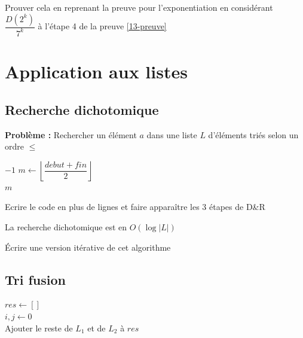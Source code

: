 \begin{exercise}
	Prouver cela en reprenant la preuve pour l'exponentiation en considérant $\dfrac{D(2^k)}{7^k}$ à l'étape 4 de la preuve \ref{13-preuve}
\end{exercise}

\section{Application aux listes}
	
\subsection{Recherche dichotomique}

\label{13-dico}

\textbf{Problème :} Rechercher un élément $a$ dans une liste $L$ d'éléments triés selon un ordre $\leq$

\begin{algorithm}[H]
	\caption{$recherche\_dichotomique(l, a, debut, fin)$}
		{\Retour $-1$}
	$m \gets \left\lfloor \dfrac{debut + fin}{2}\right\rfloor$ \\
		{\Retour $m$}
		{}
		{}
\end{algorithm}

\begin{exercise}
	Ecrire le code en plus de lignes et faire apparaître les 3 étapes de D\&R
\end{exercise}

\begin{proposition}
	La recherche dichotomique est en $O(\log |L|)$
\end{proposition}

\begin{exercise}
	Écrire une version itérative de cet algorithme
\end{exercise}

\subsection{Tri fusion}
\label{13-tri-fusion}

\begin{algorithm}[H]
	\caption{$fusion(L_1, L_2)$}
	$res \gets []$\\
	$i,j \gets 0$\\
	Ajouter le reste de $L_1$ et de $L_2$ à $res$\\
\end{algorithm}

